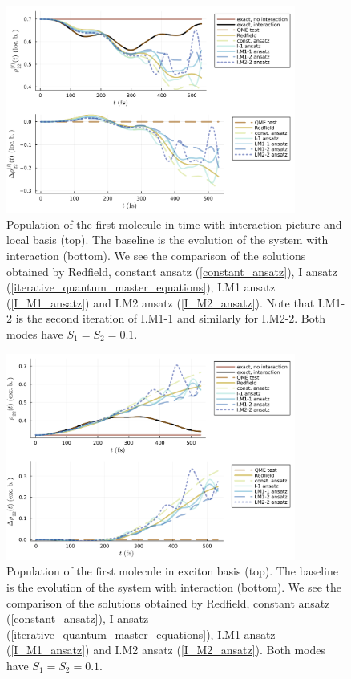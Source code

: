 \newpage
\begin{figure}[H]
\centering
\includegraphics[width=0.85\textwidth]{img/ansatz/iterative03_I_joined_intloc22.png}
\caption{Population of the first molecule in time with interaction picture and local basis (top). The baseline is the evolution of the system with interaction (bottom). We see the comparison of the solutions obtained by Redfield, constant ansatz (\ref{constant_ansatz}), I ansatz (\ref{iterative_quantum_master_equations}), I.M1 ansatz (\ref{I_M1_ansatz}) and I.M2 ansatz (\ref{I_M2_ansatz}). Note that I.M1-2 is the second iteration of I.M1-1 and similarly for I.M2-2. Both modes have $S_1=S_2=0.1$.}
\label{img:iterative03_I_joined_intloc22}
\end{figure}

\begin{figure}[H]
\centering
\includegraphics[width=0.85\textwidth]{img/ansatz/iterative03_I_joined_schexc22.png}
\caption{Population of the first molecule in exciton basis (top). The baseline is the evolution of the system with interaction (bottom). We see the comparison of the solutions obtained by Redfield, constant ansatz (\ref{constant_ansatz}), I ansatz (\ref{iterative_quantum_master_equations}), I.M1 ansatz (\ref{I_M1_ansatz}) and I.M2 ansatz (\ref{I_M2_ansatz}). Both modes have $S_1=S_2=0.1$. }
\label{img:iterative03_I_joined_schexc22}
\end{figure}


